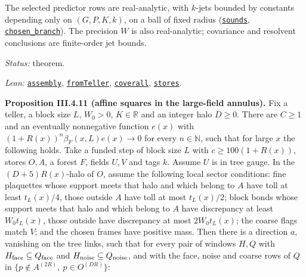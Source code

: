 \documentclass[
  letterpaper,
  11pt]{article}
\begin{document}
The selected predictor rows are real-analytic, with \(k\)-jets bounded
by constants depending only on \((G,P,K,k)\), on a ball of fixed radius
(\href{https://github.com/yang-mills-group/OpenAI-YM-20261028/blob/3456e5e75cf8d4cd558955a5c7638fba2d68f464/YM/AnalyticBridge/SECTOR_COVARIANCE_JETS/Sounds.lean\#L69-L101}{\texttt{sounds}},
\href{https://github.com/yang-mills-group/OpenAI-YM-20261028/blob/3456e5e75cf8d4cd558955a5c7638fba2d68f464/YM/AnalyticBridge/SECTOR_AFFINE_JETS/Branch.lean\#L140-L219}{\texttt{chosen\_branch}}).
The precision \(W\) is also real-analytic; covariance and resolvent
conclusions are finite-order jet bounds.

\emph{Status:} theorem.

\emph{Lean:}
\href{https://github.com/yang-mills-group/OpenAI-YM-20261028/blob/3456e5e75cf8d4cd558955a5c7638fba2d68f464/YM/AnalyticBridge/SECTOR_AFFINE_JETS/Covariance.lean\#L146-L210}{\texttt{assembly}},
\href{https://github.com/yang-mills-group/OpenAI-YM-20261028/blob/3456e5e75cf8d4cd558955a5c7638fba2d68f464/YM/AnalyticBridge/SECTOR_COVARIANCE_JETS/Sky.lean\#L62-L77}{\texttt{fromTeller}},
\href{https://github.com/yang-mills-group/OpenAI-YM-20261028/blob/3456e5e75cf8d4cd558955a5c7638fba2d68f464/YM/AnalyticBridge/SECTOR_COVARIANCE_JETS/Roof.lean\#L39-L62}{\texttt{coverall}},
\href{https://github.com/yang-mills-group/OpenAI-YM-20261028/blob/3456e5e75cf8d4cd558955a5c7638fba2d68f464/YM/PhysicalNext/PHYSICAL_JOINT_ENDPOINT_LOAD_F16/DLog/Fund.lean\#L120-L127}{\texttt{stores}}.

\textbf{Proposition III.4.11 (affine squares in the large-field
annulus).} Fix a teller, a block size \(L\), \(W_0>0\),
\(K\in\mathbb R\) and an integer halo \(D\ge0\). There are \(C\ge1\) and
an eventually nonnegative function \(e(x)\) with
\((1+R(x))^n\beta_F(x,L)e(x)\to0\) for every \(n\in\mathbb N\), such
that for large \(x\) the following holds. Take a funded step of block
size \(L\) with \(c\ge100(1+R(x))\), stores \(O,A\), a forest \(F\),
fields \(U,V\) and tags \(k\). Assume \(U\) is in tree gauge. In the
\((D+5)R(x)\)-halo of \(O\), assume the following local sector
conditions: fine plaquettes whose support meets that halo and which
belong to \(A\) have toll at least \(t_L(x)/4\), those outside \(A\)
have toll at most \(t_L(x)/2\); block bonds whose support meets that
halo and which belong to \(A\) have discrepancy at least \(W_0t_L(x)\),
those outside have discrepancy at most \(2W_0t_L(x)\); the coarse flags
match \(V\); and the chosen frames have positive mass. Then there is a
direction \(a\), vanishing on the tree links, such that for every pair
of windows \(H,Q\) with \(H_{\rm face}\subseteq Q_{\rm face}\) and
\(H_{\rm noise}\subseteq Q_{\rm noise}\), and with the face, noise and
coarse rows of \(Q\) in \(\{p\notin A^{(2R)},\ p\in O^{(DR)}\}\):
\end{document}
